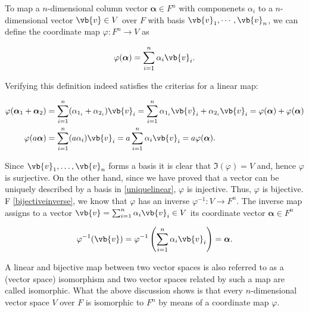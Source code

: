 \documentclass[a4paper,12pt]{report}
\begin{document}
To map a \(n\)-dimensional column vector \(\boldsymbol{\alpha } \in F^{n} \) with componenets \(\alpha _{i} \)  to a \(n\)-dimensional vector \(\vb{v} \in V\) over \(F\) with basis \(\vb{v}_1, \cdots, \vb{v}_n \), we can define the coordinate map \(\varphi : F^{n} \rightarrow V \) as      

\begin{equation}
    \varphi (\boldsymbol{\alpha } ) = \sum_{i=1}^{n} \alpha _{i} \vb{v} _{i} . 
\end{equation}

Verifying this definition indeed satisfies the criterias for a linear map:

\begin{equation}
    \begin{aligned}
    \varphi (\boldsymbol{\alpha }_{1}  + \boldsymbol{\alpha }_{2}   )  &= \sum_{i=1}^{n} (\alpha _{1_i} + \alpha  _{2_i}   )\vb{v} _{i} = \sum_{i=1}^{n} \alpha _{1_i} \vb{v} _{i}  + \alpha  _{2_i} \vb{v} _{i} = \varphi (\boldsymbol{\alpha } ) + \varphi (\boldsymbol{\alpha } )   \\
    \varphi (a \boldsymbol{\alpha } ) &= \sum_{i=1}^{n} (a \alpha _{i} ) \vb{v} _{i} = a \sum_{i=1}^{n} \alpha _{i} \vb{v} _{i} = a \varphi (\boldsymbol{\alpha } ). 
    \end{aligned}
\end{equation}

Since \(\vb{v}_{1}, \ldots, \vb{v}_n \) forms a basis it is clear that \(\Im (\varphi ) = V\) and, hence \(\varphi \) is surjective. On the other hand, since we have proved that a vector can be uniquely described by a basis in \cref{uniquelinear}, \(\varphi \) is injective. Thus, \(\varphi \) is bijective. F \cref{bijectiveinverse}, we know that \(\varphi \) has an inverse \(\varphi ^{-1} : V \rightarrow F^{n} \). The inverse map assigns to a vector \(\vb{v} = \sum_{i=1}^{n} \alpha _{i} \vb{v} _{i} \in V\) its coordinate vector \(\boldsymbol{\alpha } \in F^{n}  \)

\begin{equation}
    \varphi ^{-1} (\vb{v} ) = \varphi ^{-1} \left( \sum_{i=1}^{n} \alpha _{i} \vb{v} _{i}  \right) = \boldsymbol{\alpha }. 
\end{equation}

A linear and bijective map between two vector spaces is also referred to as a (vector space) isomorphism and two vector spaces related by such a map are called isomorphic. What the above discussion shows is that every \(n\)-dimensional vector space \(V\) over \(F\) is isomorphic to \(F^{n} \) by means of a coordinate map \(\varphi \). 
\end{document}
